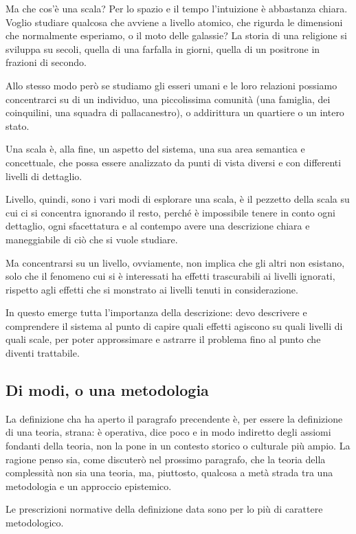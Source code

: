 \documentclass[a4paper, headings=standardclasses]{scrartcl}
\begin{document}
Ma che cos'è una scala? Per lo spazio e il tempo l'intuizione è abbastanza chiara. Voglio studiare qualcosa che avviene a livello atomico, che rigurda le dimensioni che normalmente esperiamo, o il moto delle galassie? La storia di una religione si sviluppa su secoli, quella di una farfalla in giorni, quella di un positrone in frazioni di secondo.

Allo stesso modo però se studiamo gli esseri umani e le loro relazioni possiamo concentrarci su di un individuo, una piccolissima comunità (una famiglia, dei coinquilini, una squadra di pallacanestro), o addirittura un quartiere o un intero stato.

Una scala è, alla fine, un aspetto del sistema, una sua area semantica e concettuale, che possa essere analizzato da punti di vista diversi e con differenti livelli di dettaglio.

Livello, quindi, sono i vari modi di esplorare una scala, è il pezzetto della scala su cui ci si concentra ignorando il resto, perché è impossibile tenere in conto ogni dettaglio, ogni sfacettatura e al contempo avere una descrizione chiara e maneggiabile di ciò che si vuole studiare.

Ma concentrarsi su un livello, ovviamente, non implica che gli altri non esistano, solo che il fenomeno cui si è interessati ha effetti trascurabili ai livelli ignorati, rispetto agli effetti che si monstrato ai livelli tenuti in considerazione.

In questo emerge tutta l'importanza della descrizione: devo descrivere e comprendere il sistema al punto di capire quali effetti agiscono su quali livelli di quali scale, per poter approssimare e astrarre il problema fino al punto che diventi trattabile.

\subsection{Di modi, o una metodologia}
La definizione cha ha aperto il paragrafo precendente è, per essere la definizione di una teoria, strana: è operativa, dice poco e in modo indiretto degli assiomi fondanti della teoria, non la pone in un contesto storico o culturale più ampio.
La ragione penso sia, come discuterò nel prossimo paragrafo, che la teoria della complessità non sia una teoria, ma, piuttosto, qualcosa a metà strada tra una metodologia e un approccio epistemico.

Le prescrizioni normative della definizione data sono per lo più di carattere metodologico.
\end{document}
